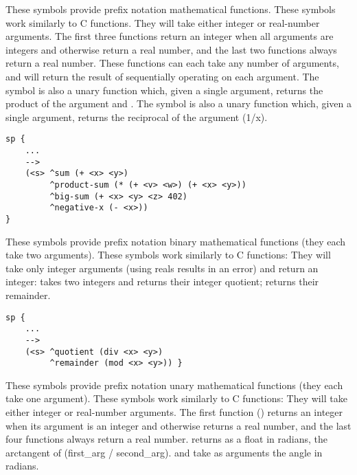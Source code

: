 \begin{description}
\item [\soarb{+, -, *, /} --- ]
        These symbols provide prefix notation mathematical functions.
        These symbols work similarly to C functions.  They will take either 
        integer or real-number arguments. The first three functions return 
        an integer when all arguments are integers
        and otherwise return a real number, and the last two functions
        always return a real number. These functions can each take any number of arguments,
        and will return the result of sequentially operating on each argument.
        The \soar{-} symbol is also a
	unary function which, given a single argument, returns the
	product of the argument and .  The \soar{/} symbol is
	also a unary function which, given a single argument, returns the
	reciprocal of the argument (1/x).

\begin{verbatim}
sp {
    ...
    -->
    (<s> ^sum (+ <x> <y>)
         ^product-sum (* (+ <v> <w>) (+ <x> <y>))
         ^big-sum (+ <x> <y> <z> 402)
         ^negative-x (- <x>))
}
\end{verbatim}

\item [\soarb{div, mod} --- ]
        These symbols provide prefix notation binary mathematical functions
        (they each take two arguments). These symbols work similarly to C
        functions: They will take only integer arguments (using reals results
        in an error) and return an integer:  takes two integers and
        returns their integer quotient;  returns their remainder.

\begin{verbatim}
sp {
    ...
    -->
    (<s> ^quotient (div <x> <y>)
         ^remainder (mod <x> <y>)) }
\end{verbatim}

\item [\soarb{abs, atan2, sqrt, sin, cos} --- ]   
        These symbols provide prefix notation unary 
        mathematical functions (they each take one argument). 
        These symbols work similarly to C functions:
        They will take either integer or real-number arguments. The
        first function () returns an integer when its argument is an
        integer and otherwise returns a real number, and the last four
        functions always return a real number.   returns as
	a float in radians, the arctangent of (first\_arg / second\_arg).
	 and  take as arguments the angle in radians.


\end{description}
